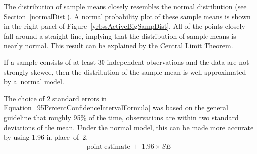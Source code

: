\begin{spacing}{1.5}

The distribution of sample means closely resembles the normal distribution (see Section~\ref{normalDist}). A normal probability plot of these sample means is shown in the right panel of Figure~\ref{yrbssActiveBigSampDist}. All of the points closely fall around a straight line, implying that the distribution of sample means is nearly normal. This result can be explained by the Central Limit Theorem.

\begin{termBox}{
If a sample consists of at least 30 independent observations and the data are not strongly skewed, then the distribution of the sample mean is well approximated by a~normal model.}
\end{termBox}

The choice of 2 standard errors in Equation~\ref{95PercentConfidenceIntervalFormula} was based on the general guideline that roughly 95\% of the time, observations are within two standard deviations of the mean. Under the normal model, this can be made more accurate by using 1.96 in place~of~2.
\begin{align}
\text{point estimate}\ \pm\ 1.96\times SE
\label{95PercentCIWhenUsingNormalModel}
\end{align}


\end{spacing}
